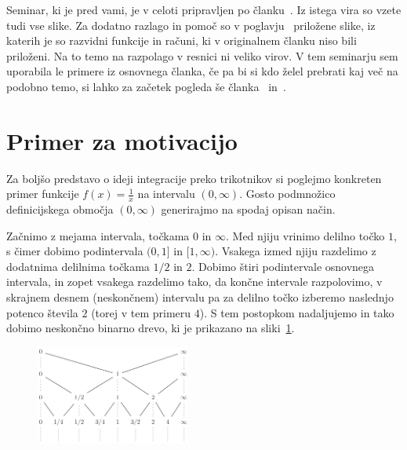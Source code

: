 \documentclass[a4paper, 12pt, titlepage]{article}
\begin{document}
Seminar, ki je pred vami, je v celoti pripravljen po članku~\cite{osnovni_clanek}. Iz istega vira so vzete tudi vse slike. Za dodatno razlago in pomoč so v poglavju~ priložene slike, iz katerih je so razvidni funkcije in računi, ki v originalnem članku niso bili priloženi. Na to temo na razpolago v resnici ni veliko virov. V tem seminarju sem uporabila le primere iz osnovnega članka, če pa bi si kdo želel prebrati kaj več na podobno temo, si lahko za začetek pogleda še članka~\cite{reciprocni_kvadrati} in~\cite{clanek_zeta}.


\newpage
\section{Primer za motivacijo}

Za boljšo predstavo o ideji integracije preko trikotnikov si poglejmo konkreten primer funkcije $ f(x) = \frac{1}{x} $ na intervalu $ (0, \infty) $. Gosto podmnožico definicijskega območja $ (0, \infty) $ generirajmo na spodaj opisan način.

Začnimo z mejama intervala, točkama $ 0 $ in $ \infty $. Med njiju vrinimo delilno točko $ 1 $, s čimer dobimo podintervala $ (0, 1] $ in $ [1, \infty) $. Vsakega izmed njiju razdelimo z dodatnima delilnima točkama $ 1/2 $ in $ 2 $. Dobimo štiri podintervale osnovnega intervala, in zopet vsakega razdelimo tako, da končne intervale razpolovimo, v skrajnem desnem (neskončnem) intervalu pa za delilno točko izberemo naslednjo potenco števila $ 2 $ (torej v tem primeru $ 4 $). S tem postopkom nadaljujemo in tako dobimo neskončno binarno drevo, ki je prikazano na sliki~\ref{uvodni_primer_drevo}.

\begin{figure}[h]
    \centering
    \includegraphics[width=0.45\textwidth]{slike/uvodni_primer_drevo.png}
    \caption{}
    \label{uvodni_primer_drevo}
\end{figure}
\end{document}
